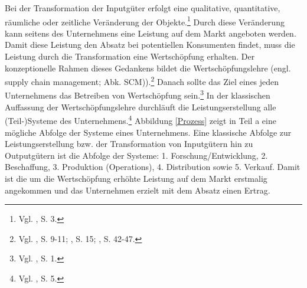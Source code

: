 Bei der Transformation der Inputgüter erfolgt eine qualitative, quantitative, räumliche oder zeitliche Veränderung der Objekte.\footnote{Vgl. \cite{Dyckhoff2010}, S. 3.} Durch diese Veränderung kann seitens des Unternehmens eine Leistung auf dem Markt angeboten werden. Damit diese Leistung den Absatz bei potentiellen Konsumenten findet, muss die Leistung durch die Transformation eine Wertschöpfung erhalten. Der konzeptionelle Rahmen dieses Gedankens bildet die Wertschöpfungslehre (engl. supply chain management; Abk. SCM)).\footnote{Vgl. \cite{Stadtler:2005aa}, S. 9-11; \cite{christopher1998logistics}, S. 15; \cite{oliver1982supply}, S. 42-47.} Danach sollte das Ziel eines jeden Unternehmens das Betreiben von Wertschöpfung sein.\footnote{Vgl. \cite{Bach:2012aa}, S. 1.} In der klassischen Auffassung der Wertschöpfungslehre durchläuft die Leistungserstellung alle (Teil-)Systeme des Unternehmens.\footnote{Vgl. \cite{Werner:2013aa}, S. 5.} Abbildung \ref{Prozess} zeigt in Teil a eine mögliche Abfolge der Systeme eines Unternehmens. Eine klassische Abfolge zur Leistungserstellung bzw. der Transformation von Inputgütern hin zu Outputgütern ist die Abfolge der Systeme: 1. Forschung/Entwicklung, 2. Beschaffung, 3. Produktion (Operations), 4. Distribution sowie 5. Verkauf. Damit ist die um die Wertschöpfung erhöhte Leistung auf dem Markt erstmalig angekommen und das Unternehmen erzielt mit dem Absatz einen Ertrag.

